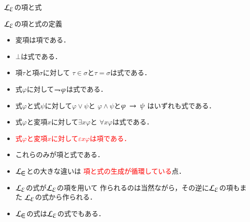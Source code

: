 \documentclass[dvipdfmx,10pt,notheorems]{beamer}
\theoremstyle{definition}
\newcommand{\lang}[1]{\mathcal{L}_{\scalebox{1.2}{$#1$}}} %
\newcommand{\negation}{\rightharpoondown\hspace{-0.25em}} %
\newcommand{\rarrow}{\hspace{0.25em}\rightarrow\hspace{0.25em}} %
\begin{document}
\begin{frame}{$\lang{\varepsilon}$の項と式}
	\begin{exampleblock}{$\lang{\varepsilon}$の項と式の定義}
		\begin{itemize}
			\item 変項は項である．
			\item $\bot$は式である．
			\item 項$\tau$と項$\sigma$に対して
				$\tau \in \sigma$と$\tau = \sigma$は式である．
			\item 式$\varphi$に対して$\negation \varphi$は式である．
			\item 式$\varphi$と式$\psi$に対して$\varphi \vee \psi$と
				$\varphi \wedge \psi$と$\varphi \rarrow \psi$
				はいずれも式である．
			\item 式$\varphi$と変項$x$に対して$\exists x \varphi$と
				$\forall x \varphi$は式である．
			\item \textcolor{red}{式$\varphi$と変項$x$に対して$\varepsilon x \varphi$は項である．}
			\item これらのみが項と式である．
		\end{itemize}
	\end{exampleblock}
	
	\begin{itemize}
		\item $\lang{\in}$との大きな違いは
		 \textcolor{red}{項と式の生成が循環している}点．
		
		\item$\lang{\varepsilon}$の式が$\lang{\varepsilon}$の項を用いて
			作られるのは当然ながら，その逆に$\lang{\varepsilon}$の項もまた
			$\lang{\varepsilon}$の式から作られる．
			
		\item $\lang{\in}$の式は$\lang{\varepsilon}$の式でもある．
	\end{itemize}
\end{frame}
\end{document}
